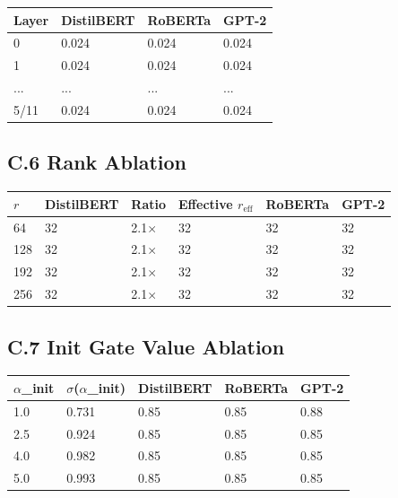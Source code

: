 \begin{table}[H]
\centering
\small
\begin{tabular}{llll}
\toprule
\textbf{Layer} & \textbf{DistilBERT} & \textbf{RoBERTa} & \textbf{GPT-2} \\
\midrule
0 & 0.024 & 0.024 & 0.024 \\
1 & 0.024 & 0.024 & 0.024 \\
... & ... & ... & ... \\
5/11 & 0.024 & 0.024 & 0.024 \\
\bottomrule
\end{tabular}
\end{table}

\subsection{C.6 Rank Ablation}

\begin{table}[H]
\centering
\small
\begin{tabular}{llllll}
\toprule
\textbf{$r$} & \textbf{DistilBERT} & \textbf{Ratio} & \textbf{Effective $r_\text{eff}$} & \textbf{RoBERTa} & \textbf{GPT-2} \\
\midrule
64 & 32 & 2.1$\times$ & 32 & 32 & 32 \\
128 & 32 & 2.1$\times$ & 32 & 32 & 32 \\
192 & 32 & 2.1$\times$ & 32 & 32 & 32 \\
256 & 32 & 2.1$\times$ & 32 & 32 & 32 \\
\bottomrule
\end{tabular}
\end{table}

\subsection{C.7 Init Gate Value Ablation}

\begin{table}[H]
\centering
\small
\begin{tabular}{lllll}
\toprule
\textbf{$\alpha$\_init} & \textbf{$\sigma$($\alpha$\_init)} & \textbf{DistilBERT} & \textbf{RoBERTa} & \textbf{GPT-2} \\
\midrule
1.0 & 0.731 & 0.85 & 0.85 & 0.88 \\
2.5 & 0.924 & 0.85 & 0.85 & 0.85 \\
4.0 & 0.982 & 0.85 & 0.85 & 0.85 \\
5.0 & 0.993 & 0.85 & 0.85 & 0.85 \\
\bottomrule
\end{tabular}
\end{table}

